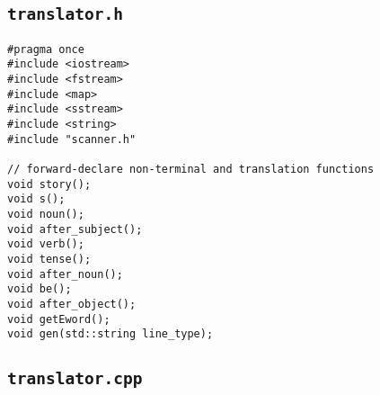 \documentclass{article}
\begin{document}
	\subsection{\texttt{translator.h}}
	\begin{Verbatim}
#pragma once
#include <iostream>
#include <fstream>
#include <map>
#include <sstream>
#include <string>
#include "scanner.h"

// forward-declare non-terminal and translation functions
void story();
void s();
void noun();
void after_subject();
void verb();
void tense();
void after_noun();
void be();
void after_object();
void getEword();
void gen(std::string line_type);
	\end{Verbatim}
	
	\subsection{\texttt{translator.cpp}}
\end{document}
